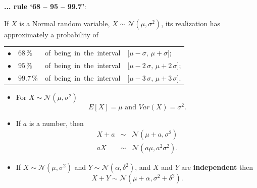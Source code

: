 \documentclass[smaller]{beamer}\usepackage[]{graphicx}\usepackage[]{color}
\newcommand{\N}{\mathcal{N}}
\newenvironment{stepitemize}{\begin{itemize}[<+->]}{\end{itemize} }
\begin{document}
\begin{frame}{\subsecname}
  \textbf{... rule `68 -- 95 -- 99.7'}: \\ \bigskip
  
  
  If $X$ is a Normal random variable, $X \sim \N(\mu, \sigma^2)$, its realization has approximately a probability of \\ \bigskip
  
  \begin{tabular}{llll}
  $\bullet$
  &
  $68 \, \%$
  &
  \mbox{of being in the interval}
  &
  $\lbrack \mu - \sigma, \, \mu + \sigma \rbrack$;\\[0.2cm]
  $\bullet$
  &
  $95 \, \%$
  &
  \mbox{of being in the interval}
  &
  $\lbrack \mu - 2 \, \sigma, \, \mu + 2 \, \sigma \rbrack$;\\[0.2cm]
  $\bullet$
  &
  $99.7 \, \%$
  &
  \mbox{of being in the interval}&
  $\lbrack \mu - 3 \, \sigma, \, \mu + 3 \, \sigma \rbrack$.\\[0.2cm]
  \end{tabular}
\end{frame}


\begin{frame}{\subsecname}
  
  \begin{stepitemize}
  \item For $X\sim \N\left( \mu ,\sigma ^{2}\right) $
  \begin{equation*}
  E\left[ X\right] =\mu \text{ and }Var\left( X\right) =\sigma ^{2}.
  \end{equation*}
  
  \item If $a$ is a number, then
  \begin{eqnarray*}
  X+a &\sim &\N\left( \mu +a,\sigma ^{2}\right) \\
  aX &\sim &\N\left( a\mu ,a^{2}\sigma ^{2}\right).
  \end{eqnarray*}
  
  \item If $X\sim \N\left( \mu ,\sigma ^{2}\right) $ and $Y\sim \N\left( \alpha
  ,\delta ^{2}\right) $, and $X$ and $Y$ are \textbf{independent} then%
  \begin{equation*}
  X+Y\sim \N\left( \mu +\alpha ,\sigma ^{2}+\delta ^{2}\right).
  \end{equation*}
  \end{stepitemize}
\end{frame}
\end{document}
